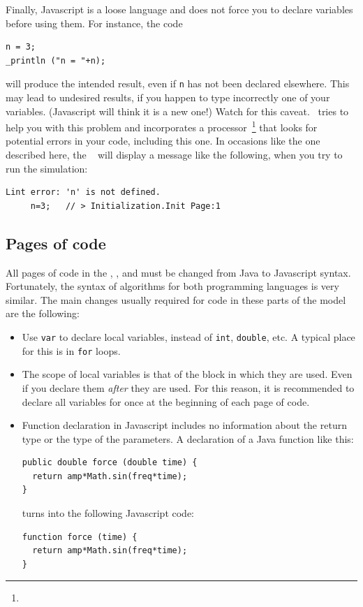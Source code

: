 Finally, Javascript is a loose language and does not force you to declare variables before using them. For instance, the code
\begin{verbatim}
n = 3;
_println ("n = "+n);
\end{verbatim}
\noindent will produce the intended result, even if \verb?n? has not been declared elsewhere. This may lead to undesired results, if you happen to type incorrectly one of your variables. (Javascript will think it is a new one!) Watch for this caveat. \ejs\ tries to help you with this problem and incorporates a  processor~\footnote{} that looks for potential errors in your code, including this one. In occasions like the one described here, the \ejs\  will display a message like the following, when you try to run the simulation:
\begin{verbatim}
Lint error: 'n' is not defined.
     n=3;   // > Initialization.Init Page:1
\end{verbatim}

\subsection{Pages of code}

All pages of code in the , ,  and  must be changed from Java to Javascript syntax. Fortunately, the syntax of algorithms for both programming languages is very similar. The main changes usually required for code in these parts of the model are the following:
\begin{itemize}
  \item Use \verb?var? to declare local variables, instead of \verb?int?, \verb?double?, etc. A typical place for this is in \verb?for? loops.
  \item The scope of local variables is that of the block in which they are used. Even if you declare them \emph{after} they are used. For this reason, it is recommended to declare all variables for once at the beginning of each page of code.
  \item Function declaration in Javascript includes no information about the return type or the type of the parameters. A declaration of a Java function like this:
\begin{verbatim}
public double force (double time) {
  return amp*Math.sin(freq*time);
}
\end{verbatim}
\noindent turns into the following Javascript code:
\begin{verbatim}
function force (time) {
  return amp*Math.sin(freq*time);
}
\end{verbatim}
\end{itemize}


